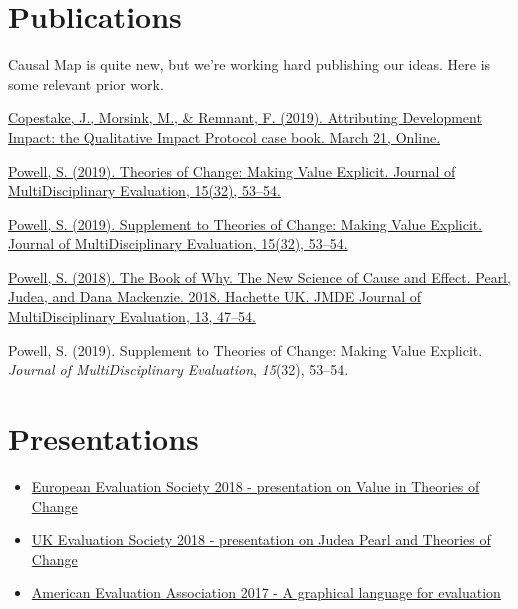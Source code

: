 \documentclass[
]{book}
\providecommand{\tightlist}{%
  \setlength{\itemsep}{0pt}\setlength{\parskip}{0pt}}
\begin{document}
\hypertarget{publications}{%
\section{Publications}\label{publications}}

Causal Map is quite new, but we're working hard publishing our ideas. Here is some relevant prior work.

\href{https://practicalactionpublishing.com/book/105/attributing-development-impact}{Copestake, J., Morsink, M., \& Remnant, F. (2019). Attributing Development Impact: the Qualitative Impact Protocol case book. March 21, Online.}

\href{https://journals.sfu.ca/jmde/index.php/jmde_1/article/view/563}{Powell, S. (2019). Theories of Change: Making Value Explicit. Journal of MultiDisciplinary Evaluation, 15(32), 53--54.}

\href{https://journals.sfu.ca/jmde/index.php/jmde_1/article/view/561}{Powell, S. (2019). Supplement to Theories of Change: Making Value Explicit. Journal of MultiDisciplinary Evaluation, 15(32), 53--54.}

\href{https://journals.sfu.ca/jmde/index.php/jmde_1/article/view/507}{Powell, S. (2018). The Book of Why. The New Science of Cause and Effect. Pearl, Judea, and Dana Mackenzie. 2018. Hachette UK. JMDE Journal of MultiDisciplinary Evaluation, 13, 47--54.}

Powell, S. (2019). Supplement to Theories of Change: Making Value Explicit. \emph{Journal of MultiDisciplinary Evaluation}, \emph{15}(32), 53--54.

\hypertarget{presentations}{%
\section{Presentations}\label{presentations}}

\begin{itemize}
\tightlist
\item
  \href{https://drive.google.com/file/d/1FdiOs85iZCqZU6MdU3Lb5kgDOxq36G3b/view?usp=sharing}{European Evaluation Society 2018 - presentation on Value in Theories of Change}
\item
  \href{https://drive.google.com/file/d/1A2gIYmechpCot2QQc0TRWGlFg9r4jsz4/view?usp=sharing}{UK Evaluation Society 2018 - presentation on Judea Pearl and Theories of Change}
\item
  \href{http://comm.eval.org/viewdocument/theorymaker-a-graphical-language}{American Evaluation Association 2017 - A graphical language for evaluation}
\end{itemize}
\end{document}
